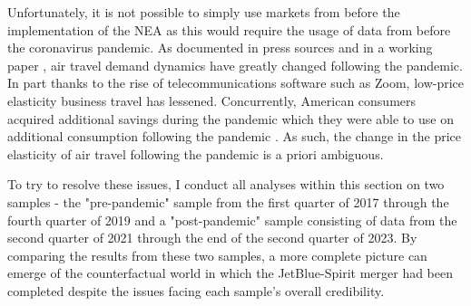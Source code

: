 \documentclass{article}
\begin{document}
	Unfortunately, it is not possible to simply use markets from before the implementation of the NEA as this would require the usage of data from before the coronavirus pandemic. As documented in press sources and in a working paper \citep{ewen_zoom_2023}, air travel demand dynamics have greatly changed following the pandemic. In part thanks to the rise of telecommunications software such as Zoom, low-price elasticity business travel has lessened. Concurrently, American consumers acquired additional savings during the pandemic which they were able to use on additional consumption following the pandemic \citep{klitgaard_spending_2023}. As such, the change in the price elasticity of air travel following the pandemic is a priori ambiguous.  
	
 	To try to resolve these issues, I conduct all analyses within this section on two samples - the "pre-pandemic" sample from the first quarter of 2017 through the fourth quarter of  2019 and a "post-pandemic" sample consisting of data from the second quarter of 2021 through the end of the second quarter of 2023. By comparing the results from these two samples, a more complete picture can emerge of the counterfactual world in which the JetBlue-Spirit merger had been completed despite the issues facing each sample's overall credibility.  
 	 	 
 	 
\end{document}
